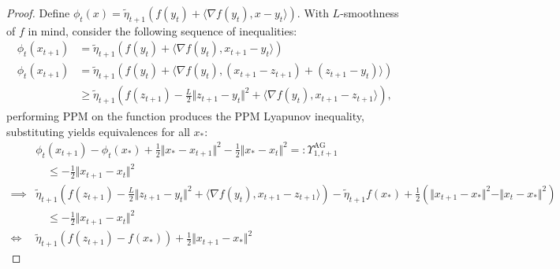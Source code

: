 \documentclass[12pt]{article}
\begin{document}
        \begin{proof}
            Define $\phi_t(x) = \tilde \eta_{t +1}(f(y_t) + \langle \nabla f(y_t), x- y_t\rangle)$.  
            With $L$-smoothness of $f$ in mind, consider the following sequence of inequalities: 
            $$
            \begin{aligned}
                \phi_t(x_{t + 1}) 
                &= 
                \tilde\eta_{t + 1} (f(y_t) + \langle \nabla f(y_t), x_{t + 1} - y_t\rangle)
                \\
                \phi_t (x_{t + 1}) &= \tilde \eta_{t + 1}(
                    f(y_t) + \langle \nabla f(y_t), (x_{t +1} - z_{t + 1}) + (z_{t + 1} - y_t) \rangle
                )
                \\
                &\ge 
                \tilde \eta_{t + 1}
                \left(
                    f(z_{t + 1}) - \frac{L}{2} \Vert z_{t + 1} - y_t\Vert^2 + 
                    \langle \nabla f(y_t), x_{t +1} - z_{t + 1}\rangle
                \right), 
            \end{aligned}
            $$
            performing PPM on the function produces the PPM Lyapunov inequality, substituting yields equivalences for all $x_*$: 
            {\footnotesize
            \begin{align*}
                & \phi_t(x_{t + 1}) - \phi_t(x_*) + \frac{1}{2}\Vert x_* - x_{t + 1}\Vert^2 
                - \frac{1}{2}\Vert x_* - x_t\Vert^2 
                =: \Upsilon_{1, t + 1}^{\text{AG}}
                \\
                &\quad \le 
                - \frac{1}{2} \Vert x_{t + 1} - x_t\Vert^2 
                \\
                \implies & 
                \tilde \eta_{t + 1}\left(
                    f(z_{t + 1}) - \frac{L}{2}\Vert z_{t + 1} - y_t\Vert^2 
                    + 
                    \langle \nabla f(y_t), x_{t + 1} - z_{t + 1}\rangle
                \right) - \tilde \eta_{t + 1} f(x_*)
                + 
                \frac{1}{2}\left(
                    \Vert x_{t + 1} - x_*\Vert^2 - \Vert x_{t} - x_*\Vert^2
                \right)
                \\
                &\quad \le
                 - \frac{1}{2}\Vert x_{t + 1} - x_t\Vert^2 
                \\
                \iff 
                & 
                \tilde \eta_{t + 1} \left(
                    f(z_{t + 1}) - f(x_*)
                \right) + \frac{1}{2}\Vert x_{t + 1} - x_*\Vert^2 

\end{align*}}
\end{proof}
\end{document}
